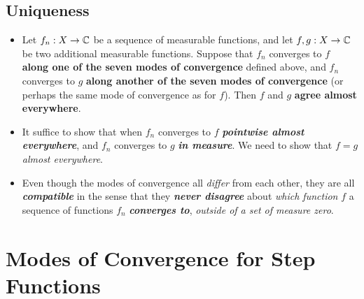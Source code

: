 \documentclass[11pt]{article}
\begin{document}
\subsection{Uniqueness}
\begin{itemize}
\item \begin{proposition}
Let $f_n : X \rightarrow {\mathbb C}$ be a sequence of measurable functions, and let $f, g : X \rightarrow {\mathbb C}$ be two additional measurable functions. Suppose that $f_n$ converges to $f$ \textbf{along one of the seven modes of convergence} defined above, and $f_n$ converges to $g$ \textbf{along another of the seven modes of convergence} (or perhaps the same mode of convergence as for $f$). Then $f$ and $g$ \textbf{agree almost everywhere}.
\end{proposition}

\item \begin{remark} It suffice to show that when $f_n$ converges to $f$ \emph{\textbf{pointwise almost everywhere}}, and $f_n$ converges to $g$ \emph{\textbf{in measure}}. We need to show that $f = g$ \emph{almost everywhere}. 
\end{remark}

\item \begin{remark}
Even though the modes of convergence all \emph{differ} from each other, they are all \emph{\textbf{compatible}} in the sense that they \emph{\textbf{never disagree}} about \emph{which function} $f$ a sequence of functions $f_n$ \emph{\textbf{converges to}}, \emph{outside of a set of measure zero}. 
\end{remark}
\end{itemize}

\section{Modes of Convergence for Step Functions}
\end{document}
